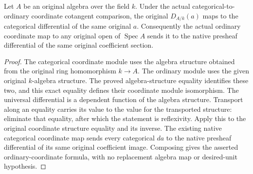 \begin{lemma}
\label{lem:kn-global-trace-native-ordinary-unit}
\leanok
Let $A$ be an original algebra over the field $k$.  Under the actual
categorical-to-ordinary coordinate cotangent comparison, the original
$D_{A/k}(a)$ maps to the categorical differential of the same original
$a$.  Consequently the actual ordinary coordinate map to any original
open of $\operatorname{Spec}A$ sends it to the native presheaf differential
of the same original coefficient section.
\end{lemma}
\begin{proof}
The categorical coordinate module uses the algebra structure obtained
from the original ring homomorphism $k\to A$.  The ordinary module uses
the given original $k$-algebra structure.  The proved algebra-structure
equality identifies these two, and this exact equality defines their
coordinate module isomorphism.  The universal differential is a dependent
function of the algebra structure.  Transport along an equality carries
its value to the value for the transported structure: eliminate that
equality, after which the statement is reflexivity.  Apply this to the
original coordinate structure equality and its inverse.  The existing
native categorical coordinate map sends every categorical $da$ to the
native presheaf differential of its same original coefficient image.
Composing gives the asserted ordinary-coordinate formula, with no
replacement algebra map or desired-unit hypothesis.
\end{proof}
